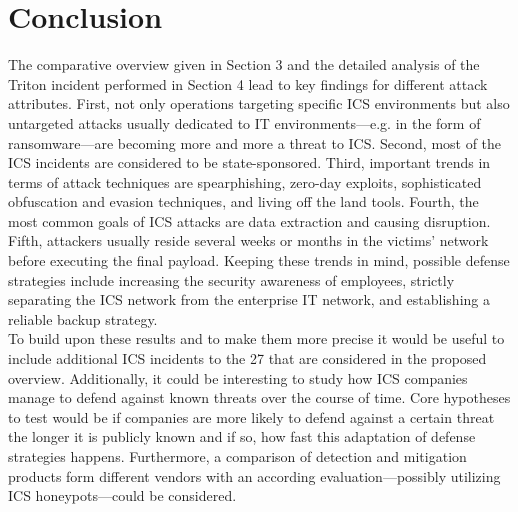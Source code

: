 \documentclass[runningheads]{llncs}
\begin{document}
\section{Conclusion}
The comparative overview given in Section 3 and the detailed analysis of the Triton incident performed in Section 4 lead to key findings for different attack attributes.
First, not only operations targeting specific ICS environments but also untargeted attacks usually dedicated to IT environments---e.g. in the form of ransomware---are becoming more and more a threat to ICS.
Second, most of the ICS incidents are considered to be state-sponsored.
Third, important trends in terms of attack techniques are spearphishing, zero-day exploits, sophisticated obfuscation and evasion techniques, and living off the land tools.
Fourth, the most common goals of ICS attacks are data extraction and causing disruption.
Fifth, attackers usually reside several weeks or months in the victims' network before executing the final payload.
Keeping these trends in mind, possible defense strategies include increasing the security awareness of employees, strictly separating the ICS network from the enterprise IT network, and establishing a reliable backup strategy. \\
To build upon these results and to make them more precise it would be useful to include additional ICS incidents to the 27 that are considered in the proposed overview.
Additionally, it could be interesting to study how ICS companies manage to defend against known threats over the course of time.
Core hypotheses to test would be if companies are more likely to defend against a certain threat the longer it is publicly known and if so, how fast this adaptation of defense strategies happens.
Furthermore, a comparison of detection and mitigation products form different vendors with an according evaluation---possibly utilizing ICS honeypots---could be considered.


\newpage
%
%
%


\end{document}
